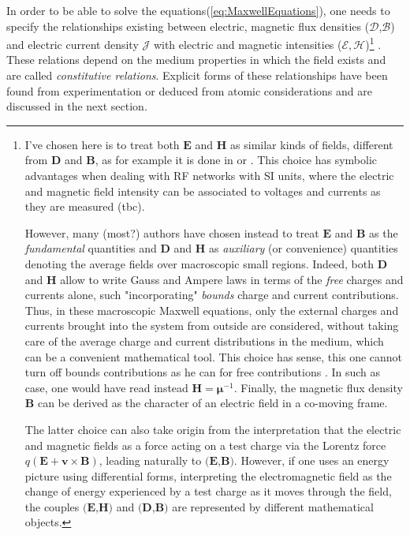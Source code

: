 In order to be able to solve the  equations(\ref{eq:MaxwellEquations}), one needs to specify the relationships existing between electric, magnetic flux densities ($\mathcal{D}$,$\mathcal{B}$) and electric current density $\mathcal{J}$ with electric and magnetic intensities ($\mathcal{E},\mathcal{H}$)\footnote{
	I've chosen here is to treat both $\mathbf{E}$ and $\mathbf{H}$ as similar kinds of fields, different from $\mathbf{D}$ and $\mathbf{B}$, as for example it is done in \parencite{Pozar1998} or \parencite{Harrington2001}. This choice has symbolic advantages when dealing with RF networks with SI units, where the electric and magnetic field intensity can be associated to voltages and currents as they are measured (tbc).
	
	However, many (most?) authors have chosen instead to treat $\mathbf{E}$ and $\mathbf{B}$ as the \emph{fundamental} quantities and $\mathbf{D}$ and $\mathbf{H}$ as \textit{auxiliary} (or convenience) quantities denoting the average fields over macroscopic small regions\parencite{Lindell1995, Griffiths2005, Jackson1999}. Indeed, both $\mathbf{D}$ and $\mathbf{H}$ allow to write Gauss and Ampere laws in terms of the \emph{free} charges and currents alone, such "incorporating" \emph{bounds} charge and current contributions. Thus, in these macroscopic Maxwell equations, only the external charges and currents brought into the system from outside are considered, without taking care of the average charge and current distributions in the medium, which can be a convenient mathematical tool. This choice has sense, this one cannot turn off bounds contributions as he can for free contributions \parencite[sec.6.3]{Griffiths2005}. In such as case, one would have read instead $\mathbf{H}=\boldsymbol{\mu}^{-1} $. Finally, the magnetic flux density $\mathbf{B}$ can be derived as the character of an electric field in a co-moving frame\parencite{Schwinger1998}.
	
	The latter choice can also take origin from the interpretation that the electric and magnetic fields as a force acting on a test charge via the Lorentz force $q(\mathbf{E}+\mathbf{v}\times\mathbf{B})$, leading naturally to $(\mathbf{E}$,$\mathbf{B})$. However, if one uses an energy picture using differential forms, interpreting the electromagnetic field as the change of energy experienced by a test charge as it moves through the field, the couples $(\mathbf{E}$,$\mathbf{H})$ and $(\mathbf{D}$,$\mathbf{B})$ are represented by different mathematical objects\parencite{Warnick2014}. 
	}
. These relations depend on the medium properties in which the field exists and are called \emph{constitutive relations}. Explicit forms of these relationships have been found from experimentation or deduced from atomic considerations \parencite[sec.5]{Schwinger1998} and are discussed in the next section.

